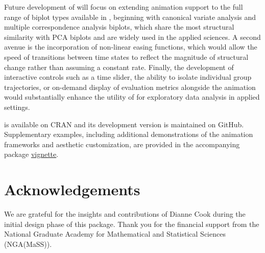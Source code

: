 Future development of  will focus on extending animation support to the full range of biplot types available in , beginning with canonical variate analysis and multiple correspondence analysis biplots, which share the most structural similarity with PCA biplots and are widely used in the applied sciences. A second avenue is the incorporation of non-linear easing functions, which would allow the speed of transitions between time states to reflect the magnitude of structural change rather than assuming a constant rate. Finally, the development of interactive controls such as a time slider, the ability to isolate individual group trajectories, or on-demand display of evaluation metrics alongside the animation would substantially enhance the utility of  for exploratory data analysis in applied settings.

 is available on CRAN and its development version is maintained on GitHub. Supplementary examples, including additional demonstrations of the animation frameworks and aesthetic customization, are provided in the accompanying package \href{https://cran.r-project.org/web/packages/moveEZ/vignettes/moveEZ.html}{vignette}.

\section{Acknowledgements}\label{acknowledgements}

We are grateful for the insights and contributions of Dianne Cook during the initial design phase of this package. Thank you for the financial support from the National Graduate Academy for Mathematical and Statistical Sciences (NGA(MaSS)).



\address{%
Raeesa Ganey\\
University of Witwatersrand and Centre for Multi-Dimensional Data Visualisation (MuViSU)\\%
Johannesburg, South Africa\\
%
%
\textit{ORCiD: \href{https://orcid.org/0009-0008-6973-0999}{0009-0008-6973-0999}}\\%
\href{mailto:raeesa.ganey@wits.ac.za}{\nolinkurl{raeesa.ganey@wits.ac.za}}%
}

\address{%
Johané Nienkemper-Swanepoel\\
Stellenbosch University and Centre for Multi-Dimensional Data Visualisation (MuViSU)\\%
Stellenbosch, South Africa\\
%
%
\textit{ORCiD: \href{https://orcid.org/0000-0001-6086-8272}{0000-0001-6086-8272}}\\%
\href{mailto:nienkemperj@sun.ac.za}{\nolinkurl{nienkemperj@sun.ac.za}}%
}
